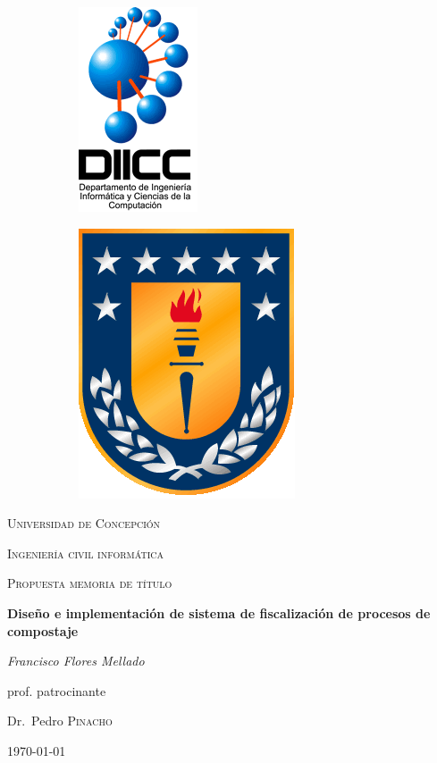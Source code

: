 \documentclass[12pt, letterpaper]{article}
\begin{document}
\begin{titlepage}
	\begin{figure}
		
		\begin{subfigure}[b]{0.5\textwidth}
			\includegraphics[scale=0.45]{figures/diicc.png}
		\end{subfigure}
		\hfill
		\begin{subfigure}[b]{0.1\textwidth}
			\includegraphics[scale=0.4]{figures/escudo_udec.png}
		\end{subfigure}
	\end{figure}
	
	\centering	
	\par\vspace{1cm}
	{\scshape\LARGE Universidad de Concepción \par}
	{\scshape Ingeniería civil informática \par}
	\vspace{1cm}
	{\scshape\Large Propuesta memoria de título\par}
	\vspace{1.5cm}
	{\huge\bfseries Diseño e implementación de sistema de fiscalización de procesos de compostaje\par}
	\vspace{2cm}
	{\Large\itshape Francisco Flores Mellado\par}
	\vfill
	prof. patrocinante\par
	Dr.~Pedro \textsc{Pinacho}

	\vfill

	{\large \today\par}
\end{titlepage}
\end{document}
